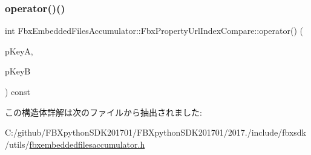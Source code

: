\subsubsection{\texorpdfstring{operator()()}{operator()()}}
{\footnotesize\ttfamily int Fbx\+Embedded\+Files\+Accumulator\+::\+Fbx\+Property\+Url\+Index\+Compare\+::operator() (\begin{DoxyParamCaption}\item[{const \hyperlink{struct_fbx_embedded_files_accumulator_1_1_property_url_index}{Property\+Url\+Index} \&}]{p\+KeyA,  }\item[{const \hyperlink{struct_fbx_embedded_files_accumulator_1_1_property_url_index}{Property\+Url\+Index} \&}]{p\+KeyB }\end{DoxyParamCaption}) const}



この構造体詳解は次のファイルから抽出されました\+:\begin{DoxyCompactItemize}
\item 
C\+:/github/\+F\+B\+Xpython\+S\+D\+K201701/\+F\+B\+Xpython\+S\+D\+K201701/2017./include/fbxsdk/utils/\hyperlink{fbxembeddedfilesaccumulator_8h}{fbxembeddedfilesaccumulator.\+h}\end{DoxyCompactItemize}
